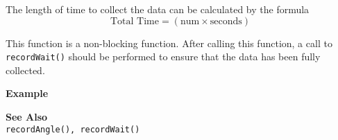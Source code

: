 The length of time to collect the data can be calculated by the formula \\
\begin{equation*}
\text{Total Time} = (\text{num} \times \text{seconds}) 
\end{equation*}

This function is a non-blocking function. After calling this function, a call to
\texttt{recordWait()} should be performed to ensure that the data has been fully collected.

\noindent
{\bf Example}\\
\noindent

\noindent
{\bf See Also}\\
\texttt{recordAngle(), recordWait()}\\
